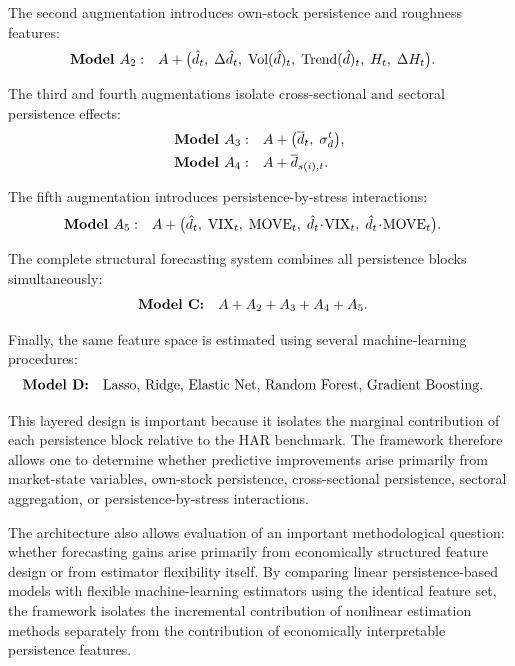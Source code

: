 \documentclass[unnumsec,webpdf,contemporary,large]{oup-authoring-template}%
\theoremstyle{thmstyleone}%
\theoremstyle{thmstyletwo}%
\theoremstyle{thmstylethree}%
\begin{document}
The second augmentation introduces own-stock persistence and roughness
features:
\begin{align}
  \textbf{Model }A_2:\quad
  &A + \bigl( \hat{d}_t,\;\Delta \hat{d}_t,\;\mathrm{Vol}( \hat{d})_t,\;
  \mathrm{Trend}( \hat{d})_t,\;H_t,\;\Delta H_t\bigr).
  \notag
\end{align}

The third and fourth augmentations isolate cross-sectional and sectoral
persistence effects:
\begin{align}
  \textbf{Model }A_3:\quad &A + \bigl(\overline{d}_t,\;\sigma_d^t\bigr),
  \notag\\
  \textbf{Model }A_4:\quad &A + \overline{d}_{s(i),t}.
  \notag
\end{align}

The fifth augmentation introduces persistence-by-stress interactions:
\begin{align}
  \textbf{Model }A_5:\quad
  &A + \bigl( \hat{d}_t,\;\mathrm{VIX}_t,\;\mathrm{MOVE}_t,\;
   \hat{d}_t\!\cdot\!\mathrm{VIX}_t,\; \hat{d}_t\!\cdot\!\mathrm{MOVE}_t\bigr).
  \notag
\end{align}

The complete structural forecasting system combines all persistence blocks
simultaneously:
\begin{align}
  \textbf{Model C:}\quad &A + A_2 + A_3 + A_4 + A_5.
  \notag
\end{align}

Finally, the same feature space is estimated using several machine-learning
procedures:
\begin{align}
  \textbf{Model D:}\quad
  &\text{Lasso, Ridge, Elastic Net, Random Forest, Gradient Boosting.}
  \notag
\end{align}

This layered design is important because it isolates the marginal
contribution of each persistence block relative to the HAR benchmark. The
framework therefore allows one to determine whether predictive improvements
arise primarily from market-state variables, own-stock persistence,
cross-sectional persistence, sectoral aggregation, or persistence-by-stress
interactions.

The architecture also allows evaluation of an important methodological
question: whether forecasting gains arise primarily from economically
structured feature design or from estimator flexibility itself. By
comparing linear persistence-based models with flexible machine-learning
estimators using the identical feature set, the framework isolates the
incremental contribution of nonlinear estimation methods separately from
the contribution of economically interpretable persistence features.
\end{document}
